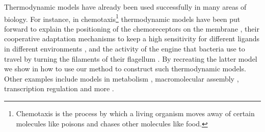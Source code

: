 Thermodynamic models have already been used successfully
in many areas of biology.
For instance, in chemotaxis\footnote{
  Chemotaxis is the process by which a living organism
  moves away of certain molecules like poisons and
  chases other molecules like food.}
thermodynamic models have been put forward to explain
the positioning of the chemoreceptors on the membrane \citep{wingreen},
their cooperative adaptation mechanisms to keep a high sensitivity
for different ligands in different environments \citep{sourjik},
and the activity of the engine that bacteria use to travel
by turning the filaments of their flagellum \citep{teuta}.
By recreating the latter model we show in 
how to use our method to construct such thermodynamic models.
Other examples include models in metabolism \citep{seba-tca,cannon},
macromolecular assembly \citep{saiz},
transcription regulation \citep{bintu}
and more \citep{kiselev}.

